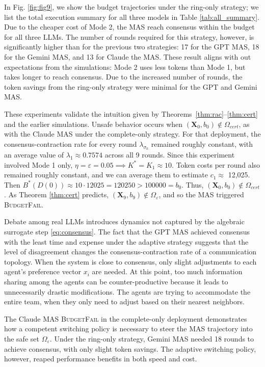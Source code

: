 \documentclass[journal,twoside,web]{ieeecolor_no_firstpage_logo}
\begin{document}
In Fig. \ref{fig:fig9}, we show the budget trajectories under the ring-only strategy; we list the total execution summary for all three models in Table \ref{tab:all_summary}. Due to the cheaper cost of Mode 2, the MAS reach consensus within the budget for all three LLMs. The number of rounds required for this strategy, however, is significantly higher than for the previous two strategies: 17 for the GPT MAS, 18 for the Gemini MAS, and 13 for Claude the MAS. These result aligns with out expectations from the simulations: Mode 2 uses less tokens than Mode 1, but takes longer to reach consensus. Due to the increased number of rounds, the token savings from the ring-only strategy were minimal for the GPT and Gemini MAS.

These experiments validate the intuition given by Theorems~\ref{thm:rac}--\ref{thm:cert} and the earlier simulations. Unsafe behavior occurs when $(\mathbf{X}_0, b_0 )\notin \Omega_{cert}$, as with the Claude MAS under the complete-only strategy. For that deployment, the consensus-contraction rate for every round $\lambda_{\sigma_k}$ remained roughly constant, with an average value of $\lambda_1 \approx 0.7574$ across all 9 rounds. Since this experiment involved Mode 1 only, $\eta = \varepsilon = 0.05 \implies K^* = K_1 \approx 10$. Token costs per round also remained roughly constant, and we can average them to estimate $c_1 \approx $ 12,025. Then $B^*(D(0)) \approx 10 \cdot 12025 = 120250 > 100000  = b_0$. Thus, $(\mathbf{X}_0, b_0) \notin \Omega_{cert}$. As Theorem \ref{thm:cert} predicts, $(\mathbf{X}_9, b_9) \notin \Omega_{\varepsilon}$, and so the MAS triggered \textsc{BudgetFail}.

Debate among real LLMs introduces dynamics not captured by the algebraic surrogate step \eqref{eq:consensus}. The fact that the GPT MAS achieved consensus with the least time and expense under the adaptive strategy suggests that the level of disagreement changes the consensus-contraction rate of a communication topology. When the system is close to consensus, only slight adjustments to each agent's preference vector $x_i$ are needed. At this point, too much information sharing among the agents can be counter-productive because it leads to unnecessarily drastic modifications. The agents are trying to accommodate the entire team, when they only need to adjust based on their nearest neighbors. 

The Claude MAS \textsc{BudgetFail} in the complete-only deployment demonstrates how a competent switching policy is necessary to steer the MAS trajectory into the safe set $\Omega_\varepsilon.$ Under the ring-only strategy, Gemini MAS needed 18 rounds to achieve consensus, with only slight token savings. The adaptive switching policy, however, reaped performance benefits in both speed and cost.
\end{document}
